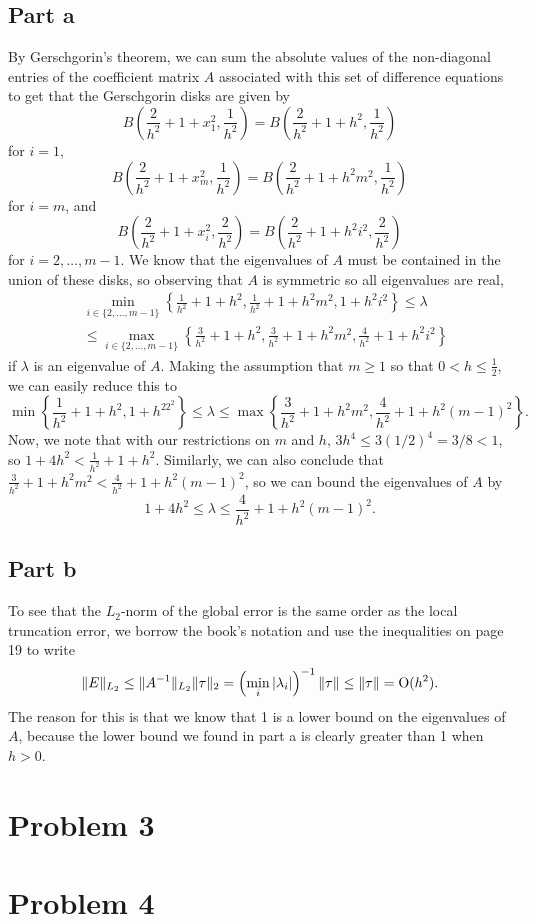 \documentclass{article}
\begin{document}
	\subsection{Part a}
By Gerschgorin's theorem, we can sum the absolute values of the non-diagonal entries of the coefficient matrix $A$ associated with this set of difference equations to get that the Gerschgorin disks are given by
\[
B\left(\frac{2}{h^2}+1+x_1^2,\frac{1}{h^2}\right)=B\left(\frac{2}{h^2}+1+h^2,\frac{1}{h^2}\right)
\]
for $i=1$,
\[
B\left(\frac{2}{h^2}+1+x_m^2,\frac{1}{h^2}\right)=B\left(\frac{2}{h^2}+1+h^2m^2,\frac{1}{h^2}\right)
\]
for $i=m$, and
\[
B\left(\frac{2}{h^2}+1+x_i^2,\frac{2}{h^2}\right)=B\left(\frac{2}{h^2}+1+h^2i^2,\frac{2}{h^2}\right)
\]
for $i=2,\ldots,m-1$. We know that the eigenvalues of $A$ must be contained in the union of these disks, so observing that $A$ is symmetric so all eigenvalues are real, 
\begin{align*}
&\min_{i\in\{2,\ldots,m-1\}}\left\{\frac{1}{h^2}+1+h^2,\frac{1}{h^2}+1+h^2m^2,1+h^2i^2\right\}\leq\lambda\\&\leq\max_{i\in\{2,\ldots,m-1\}}\left\{\frac{3}{h^2}+1+h^2,\frac{3}{h^2}+1+h^2m^2,\frac{4}{h^2}+1+h^2i^2\right\}
\end{align*}
if $\lambda$ is an eigenvalue of $A$. Making the assumption that $m\geq1$ so that $0<h\leq\frac{1}{2}$, we can easily reduce this to 
\[
\min\left\{\frac{1}{h^2}+1+h^2,1+h^22^2\right\}\leq\lambda\leq\max\left\{\frac{3}{h^2}+1+h^2m^2,\frac{4}{h^2}+1+h^2(m-1)^2\right\}.
\]
Now, we note that with our restrictions on $m$ and $h$, $3h^4\leq3(1/2)^4=3/8<1$, so $1+4h^2<\frac{1}{h^2}+1+h^2$. Similarly, we can also conclude that $\frac{3}{h^2}+1+h^2m^2<\frac{4}{h^2}+1+h^2(m-1)^2$, so we can bound the eigenvalues of $A$ by
\[
1+4h^2\leq\lambda\leq\frac{4}{h^2}+1+h^2(m-1)^2.
\]
	\subsection{Part b}
To see that the $L_2$-norm of the global error is the same order as the local truncation error, we borrow the book's notation and use the inequalities on page 19 to write
\[
\|E\|_{L_2}\leq\|A^{-1}\|_{L_2}\|\tau\|_2=\left(\min_i|\lambda_i|\right)^{-1}\|\tau\|\leq\|\tau\|=\operatorname{O}(h^2).
\]
The reason for this is that we know that 1 is a lower bound on the eigenvalues of $A$, because the lower bound we found in part a is clearly greater than 1 when $h>0$.
	
	\section{Problem 3}

	\section{Problem 4}
\end{document}
